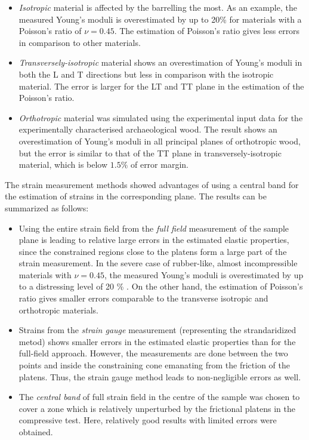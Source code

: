 \documentclass[3p]{elsarticle}
\begin{document}
\begin{itemize}
  \item \textit{Isotropic} material is affected by the barrelling the most.
  As an example, the measured Young's moduli is overestimated  by up to 20\%  for 
  materials with a Poisson's ratio of $\nu=0.45$. The estimation of Poisson's ratio
  gives less errors in comparison to other materials.
  \item \textit{Transversely-isotropic} material shows an overestimation of Young's 
  moduli in both the L and T 
  directions but less in comparison with the isotropic material. The error is larger for the LT  and TT plane in the estimation of the Poisson's ratio. 
  \item \textit{Orthotropic} material was simulated using the experimental 
  input data for the experimentally characterised archaeological wood. 
  The result shows an overestimation of Young's moduli in all principal planes 
  of orthotropic wood, but the error is similar to that of the TT plane in 
  transversely-isotropic material, which is below $1.5\%$ of error margin.
\end{itemize}

The strain measurement methods showed advantages of using a central band for
the estimation of strains in the corresponding plane. The results can be 
summarized as follows:

\begin{itemize}
  \item Using the entire strain field from the \textit{full field} measurement of the sample plane
  is leading to relative large errors in the estimated elastic properties, since
  the constrained regions close to the platens form a large part of the 
  strain measurement.  In the severe case of rubber-like, almost incompressible 
  materials with $\nu=0.45$, the measured Young's moduli is overestimated by up 
  to a distressing level of 20 \% . On the other hand, the estimation of Poisson's 
  ratio gives smaller errors comparable to the transverse isotropic and orthotropic 
  materials.
  \item Strains from the \textit{strain gauge} measurement 
  (representing the strandaridized metod) shows smaller errors in the 
  estimated elastic properties than for the full-field approach. 
  However, the measurements are done between the two points and inside the 
  constraining cone emanating from the friction of the platens. 
  Thus, the strain gauge method leads to non-negligible errors as well.
  \item  The \textit{central band} of full strain field in the centre of the 
  sample was chosen to cover a zone which is relatively unperturbed by the 
  frictional platens in the compressive test. Here, relatively good results with 
  limited errors were obtained.
\end{itemize}
\end{document}
